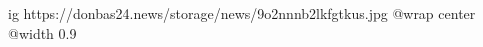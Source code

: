  
 
 
 
 

\ifcmt
  ig https://donbas24.news/storage/news/9o2nnnb2lkfgtkus.jpg
  @wrap center
  @width 0.9
\fi
